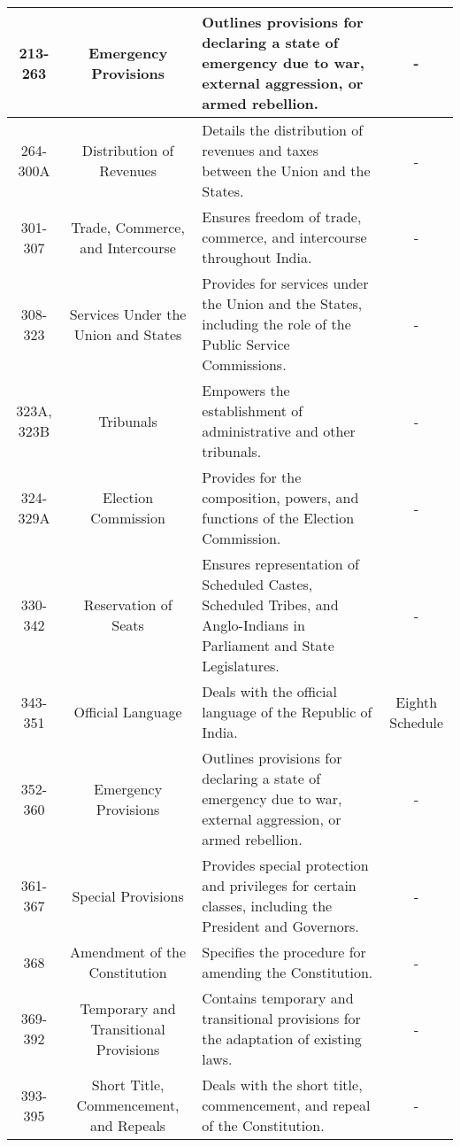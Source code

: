 \documentclass{article}
\begin{document}
\begin{center}
\begin{tabular}{|c|c|p{8cm}|c|}
\hline
213-263 & Emergency Provisions & Outlines provisions for declaring a state of emergency due to war, external aggression, or armed rebellion. & - \\
\hline
264-300A & Distribution of Revenues & Details the distribution of revenues and taxes between the Union and the States. & - \\
\hline
301-307 & Trade, Commerce, and Intercourse & Ensures freedom of trade, commerce, and intercourse throughout India. & - \\
\hline
308-323 & Services Under the Union and States & Provides for services under the Union and the States, including the role of the Public Service Commissions. & - \\
\hline
323A, 323B & Tribunals & Empowers the establishment of administrative and other tribunals. & - \\
\hline
324-329A & Election Commission & Provides for the composition, powers, and functions of the Election Commission. & - \\
\hline
330-342 & Reservation of Seats & Ensures representation of Scheduled Castes, Scheduled Tribes, and Anglo-Indians in Parliament and State Legislatures. & - \\
\hline
343-351 & Official Language & Deals with the official language of the Republic of India. & Eighth Schedule \\
\hline
352-360 & Emergency Provisions & Outlines provisions for declaring a state of emergency due to war, external aggression, or armed rebellion. & - \\
\hline
361-367 & Special Provisions & Provides special protection and privileges for certain classes, including the President and Governors. & - \\
\hline
368 & Amendment of the Constitution & Specifies the procedure for amending the Constitution. & - \\
\hline
369-392 & Temporary and Transitional Provisions & Contains temporary and transitional provisions for the adaptation of existing laws. & - \\
\hline
393-395 & Short Title, Commencement, and Repeals & Deals with the short title, commencement, and repeal of the Constitution. & - \\
\hline
\end{tabular}
\end{center}
\end{document}
